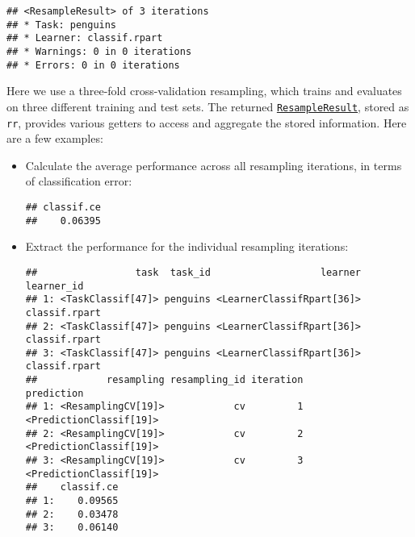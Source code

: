 \documentclass[
]{scrbook}
\newenvironment{Shaded}{\begin{snugshade}}{\end{snugshade}}
\newcommand{\FunctionTok}[1]{\textcolor[rgb]{0.00,0.00,0.00}{#1}}
\newcommand{\NormalTok}[1]{#1}
\newcommand{\SpecialCharTok}[1]{\textcolor[rgb]{0.00,0.00,0.00}{#1}}
\newcommand{\StringTok}[1]{\textcolor[rgb]{0.31,0.60,0.02}{#1}}
\renewenvironment{Shaded} {\begin{snugshade}\small} {\end{snugshade}}
\begin{document}
\begin{verbatim}
## <ResampleResult> of 3 iterations
## * Task: penguins
## * Learner: classif.rpart
## * Warnings: 0 in 0 iterations
## * Errors: 0 in 0 iterations
\end{verbatim}

Here we use a three-fold cross-validation resampling, which trains and evaluates on three different training and test sets.
The returned \href{https://mlr3.mlr-org.com/reference/ResampleResult.html}{\texttt{ResampleResult}}, stored as \texttt{rr}, provides various getters to access and aggregate the stored information.
Here are a few examples:

\begin{itemize}
\item
  Calculate the average performance across all resampling iterations, in terms of classification error:

\begin{Shaded}
\end{Shaded}

\begin{verbatim}
## classif.ce 
##    0.06395
\end{verbatim}
\item
  Extract the performance for the individual resampling iterations:

\begin{Shaded}
\end{Shaded}

\begin{verbatim}
##                 task  task_id                   learner    learner_id
## 1: <TaskClassif[47]> penguins <LearnerClassifRpart[36]> classif.rpart
## 2: <TaskClassif[47]> penguins <LearnerClassifRpart[36]> classif.rpart
## 3: <TaskClassif[47]> penguins <LearnerClassifRpart[36]> classif.rpart
##            resampling resampling_id iteration              prediction
## 1: <ResamplingCV[19]>            cv         1 <PredictionClassif[19]>
## 2: <ResamplingCV[19]>            cv         2 <PredictionClassif[19]>
## 3: <ResamplingCV[19]>            cv         3 <PredictionClassif[19]>
##    classif.ce
## 1:    0.09565
## 2:    0.03478
## 3:    0.06140
\end{verbatim}


\end{itemize}
\end{document}
